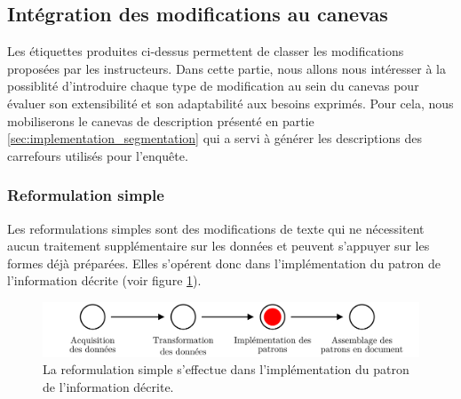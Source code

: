 \subsection{Intégration des modifications au canevas}
\label{sec:evaluation_pipeline}

Les étiquettes produites ci-dessus permettent de classer les modifications proposées par les instructeurs. Dans cette partie, nous allons nous intéresser à la possiblité d'introduire chaque type de modification au sein du canevas pour évaluer son  extensibilité et son adaptabilité aux besoins exprimés. Pour cela, nous mobiliserons le canevas de description présenté en partie \ref{sec:implementation_segmentation} qui a servi à générer les descriptions des carrefours utilisés pour l'enquête.


\subsubsection{Reformulation simple}

Les reformulations simples sont des modifications de texte qui ne nécessitent aucun traitement supplémentaire sur les données et peuvent s'appuyer sur les formes déjà préparées. Elles s'opérent donc dans l'implémentation du patron de l'information décrite (voir figure \ref{fig:evaluation_reformulation_simple}). 

\begin{figure}[ht]
    \centering
    \includegraphics[width=\textwidth]{images/evaluation/pipeline/pipeline_reformulation_simple.pdf}
    \caption[Reformulation simple dans la chaîne de description]{La reformulation simple s'effectue dans l'implémentation du patron de l'information décrite.}
    \label{fig:evaluation_reformulation_simple}
\end{figure}

\newpar{}

